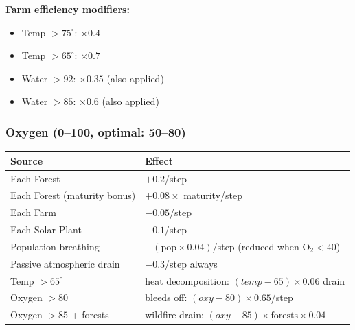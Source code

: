 \documentclass[12pt,a4paper]{article}
\begin{document}
\textbf{Farm efficiency modifiers:}
\begin{itemize}[leftmargin=1.5cm]
    \item Temp $> 75^\circ$: $\times 0.4$
    \item Temp $> 65^\circ$: $\times 0.7$
    \item Water $> 92$: $\times 0.35$ (also applied)
    \item Water $> 85$: $\times 0.6$ (also applied)
\end{itemize}

\vspace{0.3cm}
\subsubsection*{Oxygen (0--100, optimal: 50--80)}
\vspace{0.1cm}
\begin{center}
\small
\begin{tabular}{ll}
\toprule
\textbf{Source} & \textbf{Effect} \\
\midrule
Each Forest                  & $+0.2$/step \\
Each Forest (maturity bonus) & $+0.08 \times$ maturity/step \\
Each Farm                    & $-0.05$/step \\
Each Solar Plant             & $-0.1$/step \\
Population breathing         & $-(\text{pop} \times 0.04)$/step (reduced when O$_2 < 40$) \\
Passive atmospheric drain    & $-0.3$/step always \\
Temp $> 65^\circ$            & heat decomposition: $(temp - 65) \times 0.06$ drain \\
Oxygen $> 80$                & bleeds off: $(oxy - 80) \times 0.65$/step \\
Oxygen $> 85$ + forests      & wildfire drain: $(oxy - 85) \times \text{forests} \times 0.04$ \\
\bottomrule
\end{tabular}
\end{center}

\vspace{0.3cm}
\end{document}
